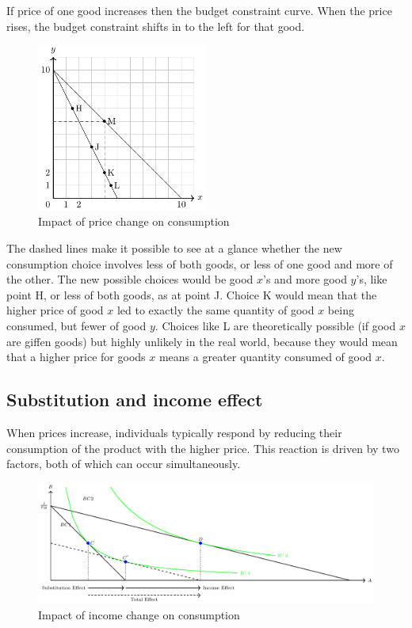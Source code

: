 \documentclass[
  12pt,
  oneside]{book}
\theoremstyle{definition}
\theoremstyle{definition}
\theoremstyle{definition}
\theoremstyle{definition}
\theoremstyle{remark}
\begin{document}
If price of one good increases then the budget constraint curve. When the price rises, the budget constraint shifts in to the left for that good.

\begin{figure}
\centering
\includegraphics[width=0.5\textwidth,height=\textheight]{fig/pricechange.png}
\caption{\label{fig:pricechange} Impact of price change on consumption}
\end{figure}

The dashed lines make it possible to see at a glance whether the new consumption choice involves less of both goods, or less of one good and more of the other. The new possible choices would be good \(x\)'s and more good \(y\)'s, like point H, or less of both goods, as at point J. Choice K would mean that the higher price of good \(x\) led to exactly the same quantity of good \(x\) being consumed, but fewer of good \(y\). Choices like L are theoretically possible (if good \(x\) are giffen goods) but highly unlikely in the real world, because they would mean that a higher price for goods \(x\) means a greater quantity consumed of good \(x\).

\hypertarget{substitution-and-income-effect}{%
\subsection{Substitution and income effect}\label{substitution-and-income-effect}}

When prices increase, individuals typically respond by reducing their consumption of the product with the higher price. This reaction is driven by two factors, both of which can occur simultaneously.

\begin{figure}
\centering
\includegraphics[width=1\textwidth,height=\textheight]{fig/hicksdecomp.png}
\caption{\label{fig:hicksdecomp} Impact of income change on consumption}
\end{figure}
\end{document}
